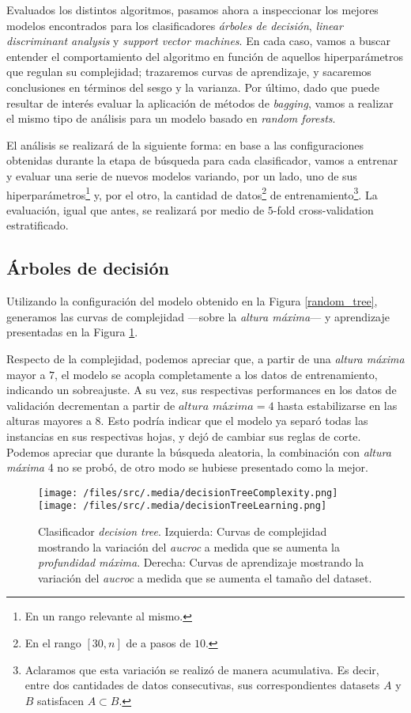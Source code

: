 Evaluados los distintos algoritmos, pasamos ahora a inspeccionar los mejores modelos encontrados para los clasificadores \textit{árboles de decisión}, \textit{linear discriminant analysis} y \textit{support vector machines}. En cada caso, vamos a buscar entender el comportamiento del algoritmo en función de aquellos hiperparámetros que regulan su complejidad; trazaremos curvas de aprendizaje, y sacaremos conclusiones en términos del sesgo y la varianza. Por último, dado que puede resultar de interés evaluar la aplicación de métodos de \textit{bagging}, vamos a realizar el mismo tipo de análisis para un modelo basado en \textit{random forests}.

El análisis se realizará de la siguiente forma: en base a las configuraciones obtenidas durante la etapa de búsqueda para cada clasificador, vamos a entrenar y evaluar una serie de nuevos modelos variando, por un lado, uno de sus hiperparámetros\footnote{En un rango relevante al mismo.} y, por el otro, la cantidad de datos\footnote{En el rango $[30, n]$ de a pasos de $10$.} de entrenamiento\footnote{Aclaramos que esta variación se realizó de manera acumulativa. Es decir, entre dos cantidades de datos consecutivas, sus correspondientes datasets $A$ y $B$ satisfacen $A \subset B$.}. La evaluación, igual que antes, se realizará por medio de $5$-fold cross-validation estratificado.

\subsection{Árboles de decisión}
Utilizando la configuración del modelo obtenido en la Figura \ref{random_tree}, generamos las curvas de complejidad ---sobre la \textit{altura máxima}--- y aprendizaje presentadas en la Figura \ref{decisionTreeComplexity}.  

Respecto de la complejidad, podemos apreciar que, a partir de una \textit{altura máxima} mayor a $7$, el modelo se acopla completamente a los datos de entrenamiento, indicando un sobreajuste. A su vez, sus respectivas performances en los datos de validación decrementan a partir de $\textit{altura máxima} = 4$ hasta estabilizarse en las alturas mayores a $8$. Esto podría indicar que el modelo ya separó todas las instancias en sus respectivas hojas, y dejó de cambiar sus reglas de corte. 
Podemos apreciar que durante la búsqueda aleatoria, la combinación con \textit{altura máxima} 4 no se probó, de otro modo se hubiese presentado como la mejor.

\vspace{0.5em}
\begin{figure}[!htbp] 
    \centering
    \texttt{[image: /files/src/.media/decisionTreeComplexity.png]}
    \texttt{[image: /files/src/.media/decisionTreeLearning.png]}
    \caption{Clasificador \textit{decision tree}. Izquierda: Curvas de complejidad mostrando la variación del \textit{aucroc} a medida que se aumenta la \textit{profundidad máxima}. Derecha: Curvas de aprendizaje mostrando la variación del \textit{aucroc} a medida que se aumenta el tamaño del dataset.}
    \label{decisionTreeComplexity}
\end{figure}

